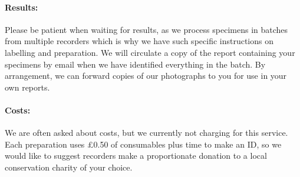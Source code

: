\documentclass[12pt]{article}
\begin{document}
\paragraph{Results:}Please be patient when waiting for results, as we process specimens in batches from multiple recorders which is why we have such specific instructions on labelling and preparation. We will circulate a copy of the report containing your specimens by email when we have identified everything in the batch. By arrangement, we can forward copies of our photographs to you for use in your own reports.

\paragraph{Costs:}We are often asked about costs, but we currently not charging for this service.  Each preparation uses \pounds 0.50 of consumables plus time to make an ID, so we would like to suggest recorders make a proportionate donation to a local conservation charity of your choice. 

\end{document}
